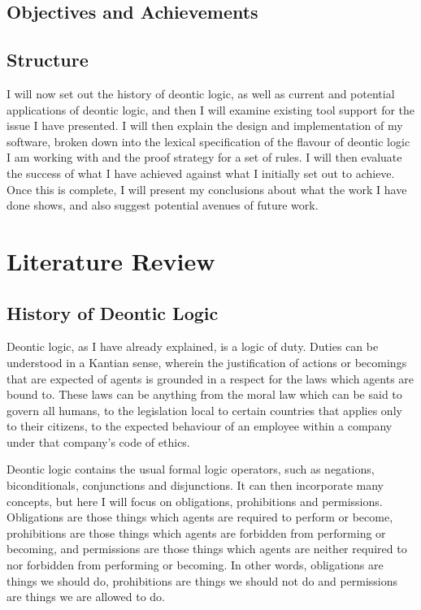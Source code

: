 \documentclass{l4proj}
\begin{document}
\section{Objectives and Achievements}

\section{Structure}
I will now set out the history of deontic logic, as well as current and potential applications of deontic logic, and then I will examine existing tool support for the issue I have presented. I will then explain the design and implementation of my software, broken down into the lexical specification of the flavour of deontic logic I am working with and the proof strategy for a set of rules. I will then evaluate the success of what I have achieved against what I initially set out to achieve. Once this is complete, I will present my conclusions about what the work I have done shows, and also suggest potential avenues of future work. 

\chapter{Literature Review}

\section{History of Deontic Logic}%
Deontic logic, as I have already explained, is a logic of duty. Duties can be understood in a Kantian sense, wherein the justification of actions or becomings that are expected of agents is grounded in a respect for the laws which agents are bound to\cite{sep-kant-moral}. These laws can be anything from the moral law which can be said to govern all humans, to the legislation local to certain countries that applies only to their citizens, to the expected behaviour of an employee within a company under that company's code of ethics. 

Deontic logic contains the usual formal logic operators, such as negations, biconditionals, conjunctions and disjunctions. It can then incorporate many concepts, but here I will focus on obligations, prohibitions and permissions. Obligations are those things which agents are required to perform or become, prohibitions are those things which agents are forbidden from performing or becoming, and permissions are those things which agents are neither required to nor forbidden from performing or becoming. In other words, obligations are things we should do, prohibitions are things we should not do and permissions are things we are allowed to do. 
\end{document}
